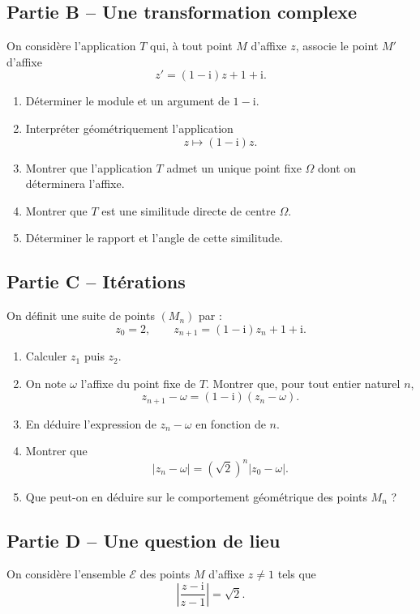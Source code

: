 \documentclass[11pt,a4paper]{article}
\newcommand{\ii}{\mathrm{i}}
\begin{document}
\subsection*{Partie B -- Une transformation complexe}
On considère l'application \(T\) qui, à tout point \(M\) d'affixe \(z\), associe le point \(M'\) d'affixe
\[
z'=(1-\ii)z+1+\ii.
\]

\begin{enumerate}[label=\textbf{3.\arabic*}, resume, leftmargin=1.6em]
    \item Déterminer le module et un argument de \(1-\ii\).
    \item Interpréter géométriquement l'application
    \[
    z\mapsto (1-\ii)z.
    \]
    \item Montrer que l'application \(T\) admet un unique point fixe \(\Omega\) dont on déterminera l'affixe.
    \item Montrer que \(T\) est une similitude directe de centre \(\Omega\).
    \item Déterminer le rapport et l'angle de cette similitude.
\end{enumerate}

\subsection*{Partie C -- Itérations}
On définit une suite de points \((M_n)\) par :
\[
z_0=2,\qquad z_{n+1}=(1-\ii)z_n+1+\ii.
\]

\begin{enumerate}[label=\textbf{3.\arabic*}, resume, leftmargin=1.6em]
    \item Calculer \(z_1\) puis \(z_2\).
    \item On note \(\omega\) l'affixe du point fixe de \(T\). Montrer que, pour tout entier naturel \(n\),
    \[
    z_{n+1}-\omega=(1-\ii)(z_n-\omega).
    \]
    \item En déduire l'expression de \(z_n-\omega\) en fonction de \(n\).
    \item Montrer que
    \[
    |z_n-\omega|=(\sqrt2)^n|z_0-\omega|.
    \]
    \item Que peut-on en déduire sur le comportement géométrique des points \(M_n\) ?
\end{enumerate}

\subsection*{Partie D -- Une question de lieu}
On considère l'ensemble \(\mathcal E\) des points \(M\) d'affixe \(z\neq 1\) tels que
\[
\left|\frac{z-\ii}{z-1}\right|=\sqrt2.
\]
\end{document}
